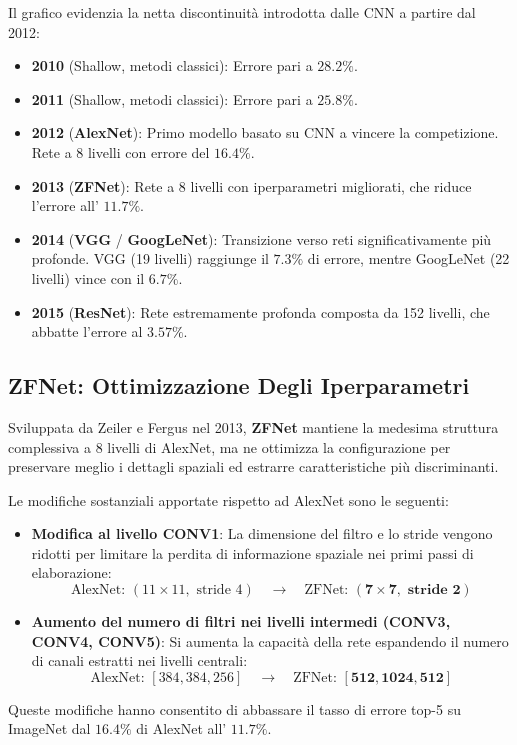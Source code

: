 ﻿\documentclass[11pt, a4paper]{article}
\begin{document}

Il grafico evidenzia la netta discontinuità introdotta dalle CNN a partire dal 2012:
\begin{itemize}
    \item \textbf{2010} (Shallow, metodi classici): Errore pari a $28.2\%$.
    \item \textbf{2011} (Shallow, metodi classici): Errore pari a $25.8\%$.
    \item \textbf{2012} (\textbf{AlexNet}): Primo modello basato su CNN a vincere la competizione. Rete a 8 livelli con errore del $16.4\%$.
    \item \textbf{2013} (\textbf{ZFNet}): Rete a 8 livelli con iperparametri migliorati, che riduce l'errore all' $11.7\%$.
    \item \textbf{2014} (\textbf{VGG} / \textbf{GoogLeNet}): Transizione verso reti significativamente più profonde. VGG (19 livelli) raggiunge il $7.3\%$ di errore, mentre GoogLeNet (22 livelli) vince con il $6.7\%$.
    \item \textbf{2015} (\textbf{ResNet}): Rete estremamente profonda composta da 152 livelli, che abbatte l'errore al $3.57\%$.
\end{itemize}

\subsection{ZFNet: Ottimizzazione Degli Iperparametri}

Sviluppata da Zeiler e Fergus nel 2013, \textbf{ZFNet} mantiene la medesima struttura complessiva a 8 livelli di AlexNet, ma ne ottimizza la configurazione per preservare meglio i dettagli spaziali ed estrarre caratteristiche più discriminanti.


Le modifiche sostanziali apportate rispetto ad AlexNet sono le seguenti:
\begin{itemize}
    \item \textbf{Modifica al livello CONV1}: La dimensione del filtro e lo stride vengono ridotti per limitare la perdita di informazione spaziale nei primi passi di elaborazione:
    \[
    \text{AlexNet: } (11 \times 11, \text{ stride } 4) \quad \longrightarrow \quad \text{ZFNet: } \mathbf{(7 \times 7, \text{ stride } 2)}
    \]
    \item \textbf{Aumento del numero di filtri nei livelli intermedi (CONV3, CONV4, CONV5)}: Si aumenta la capacità della rete espandendo il numero di canali estratti nei livelli centrali:
    \[
    \text{AlexNet: } [384, 384, 256] \quad \longrightarrow \quad \text{ZFNet: } \mathbf{[512, 1024, 512]}
    \]
\end{itemize}
Queste modifiche hanno consentito di abbassare il tasso di errore top-5 su ImageNet dal $16.4\%$ di AlexNet all' \textbf{$11.7\%$}.
\end{document}
